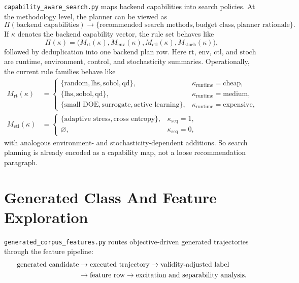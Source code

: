 \documentclass[11pt]{article}
\begin{document}
\texttt{capability\_aware\_search.py} maps backend capabilities into search
policies. At the methodology level, the planner can be viewed as
\begin{equation}
    \Pi(\text{backend capabilities})
    \rightarrow
    \{\text{recommended search methods}, \text{budget class}, \text{planner rationale}\}.
\end{equation}
If \(\kappa\) denotes the backend capability vector, the rule set behaves like
\begin{equation}
    \Pi(\kappa)
    =
    \big(
        M_{\text{rt}}(\kappa),
        M_{\text{env}}(\kappa),
        M_{\text{ctl}}(\kappa),
        M_{\text{stoch}}(\kappa)
    \big),
\end{equation}
followed by deduplication into one backend plan row.
Here \(\text{rt}\), \(\text{env}\), \(\text{ctl}\), and \(\text{stoch}\) are
runtime, environment, control, and stochasticity summaries.
Operationally, the current rule families behave like
\begin{align}
    M_{\text{rt}}(\kappa)
    &=
    \begin{cases}
        \{\text{random},\text{lhs},\text{sobol},\text{qd}\}, & \kappa_{\text{runtime}}=\text{cheap}, \\
        \{\text{lhs},\text{sobol},\text{qd}\}, & \kappa_{\text{runtime}}=\text{medium}, \\
        \{\text{small DOE},\text{surrogate},\text{active learning}\}, & \kappa_{\text{runtime}}=\text{expensive},
    \end{cases}
    \\
    M_{\text{ctl}}(\kappa)
    &=
    \begin{cases}
        \{\text{adaptive stress},\text{cross entropy}\}, & \kappa_{\text{seq}}=1, \\
        \varnothing, & \kappa_{\text{seq}}=0,
    \end{cases}
\end{align}
with analogous environment- and stochasticity-dependent additions. So search
planning is already encoded as a capability map, not a loose recommendation
paragraph.

\section{Generated Class And Feature Exploration}

\texttt{generated\_corpus\_features.py} routes objective-driven generated
trajectories through the feature pipeline:
\begin{align}
    \text{generated candidate}
    &\rightarrow \text{executed trajectory}
    \rightarrow \text{validity-adjusted label} \notag \\
    &\rightarrow \text{feature row}
    \rightarrow \text{excitation and separability analysis}.
\end{align}
\end{document}
